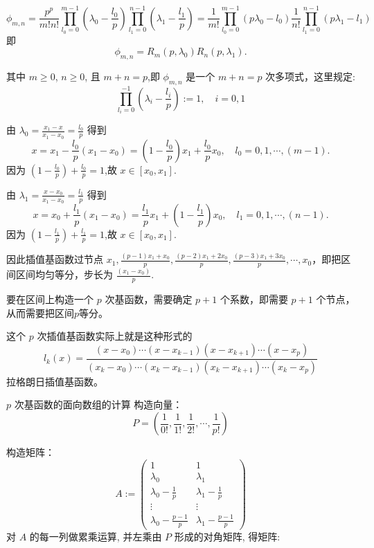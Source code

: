 \documentclass[12pt,a4paper]{article}
\begin{document}
$$
\phi_{m,n}  = \frac{p^p}{m!n!}\prod_{l_0 = 0}^{m - 1}(\lambda_0 - \frac{l_0}{p}) \prod_{l_1 = 0}^{n-1}(\lambda_1 -\frac{l_1}{p})
= \frac{1}{m!}\prod_{l_0 = 0}^{m - 1}(p\lambda_0 -l_0)\frac{1}{n!}\prod_{l_1 = 0}^{n - 1}(p\lambda_1 -l_1)
$$
即
$$
\phi_{m,n}= R_m (p,\lambda_0)R_n (p,\lambda_1).
$$

其中 $m\geq 0$, $n\geq 0$, 且 $m+n=p$,即 $\phi_{m,n}$ 是一个 $m+n=p$ 次多项式，这里规定:
$$
 \prod_{l_i=0}^{-1}(\lambda_i - \frac{l_i}{p}) := 1,\quad i=0, 1
$$

由 $\lambda_0=\frac{x_1 - x}{x_1 - x_0}=\frac{l_0}{p}$ 得到
$$
x=x_1-\frac{l_0}{p} (x_1 - x_0)=(1-\frac{l_0}{p})x_1 + \frac{l_0}{p} x_0,\quad l_0=0,1,\cdots ,(m-1).
$$
因为 $(1-\frac{l_0}{p}) + \frac{l_0}{p} =1$,故 $x\in [x_0,x_1].$

由 $\lambda_1=\frac{x - x_0}{x_1 - x_0}=\frac{l_1}{p}$ 得到
$$
x=x_0+\frac{l_1}{p} (x_1 - x_0)=\frac{l_1}{p} x_1 + (1-\frac{l_1}{p})x_0,\quad l_1=0,1,\cdots ,(n-1).
$$
因为 $(1-\frac{l_1}{p}) + \frac{l_1}{p} =1$,故 $x\in [x_0,x_1].$

因此插值基函数过节点 $x_1,\frac{(p-1)x_1 + x_0}{p},\frac{(p-2)x_1 + 2x_0}{p},\frac{(p-3)x_1 + 3x_0}{p},\cdots,x_0$，即把区间区间均匀等分，步长为 $\frac{(x_1-x_0)}{p}$.

要在区间上构造一个 $p$ 次基函数，需要确定 $p+1$ 个系数，即需要 $p+1$ 个节点，从而需要把区间$p$等分。

这个 $p$ 次插值基函数实际上就是这种形式的
$$
l_k(x)=\frac{(x-x_0)\cdots(x-x_{k-1})(x-x_{k+1})\cdots(x - x_p)}{(x_k-x_0)\cdots(x_k-x_{k-1})(x_k-x_{k+1})\cdots(x_k-x_p)}
$$
拉格朗日插值基函数。

$p$ 次基函数的面向数组的计算
构造向量：
$$
P = ( \frac{1}{0!},  \frac{1}{1!}, \frac{1}{2!}, \cdots, \frac{1}{p!})
$$

构造矩阵：
$$
A :=                                                                            
\begin{pmatrix}  
1  &  1  \\
\lambda_0 & \lambda_1\\                                             
\lambda_0 - \frac{1}{p} & \lambda_1 - \frac{1}{p}\\   
\vdots & \vdots \\                                                     
\lambda_0 - \frac{p - 1}{p} & \lambda_1 - \frac{p - 1}{p}
\end{pmatrix}                                                                   
$$ 
对 $A$ 的每一列做累乘运算, 并左乘由 $P$ 形成的对角矩阵, 得矩阵:
\end{document}
